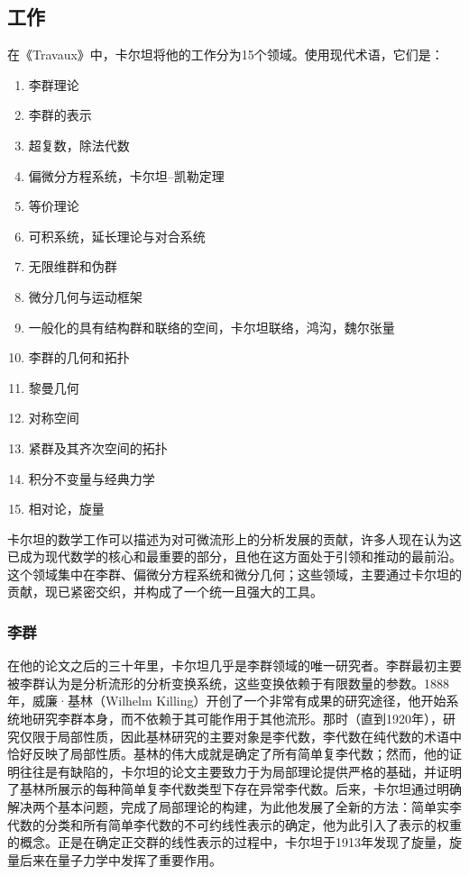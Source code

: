 \subsection{工作}  
在《Travaux》中，卡尔坦将他的工作分为15个领域。使用现代术语，它们是：
\begin{enumerate}
\item 李群理论  
\item 李群的表示  
\item 超复数，除法代数  
\item 偏微分方程系统，卡尔坦–凯勒定理  
\item 等价理论  
\item 可积系统，延长理论与对合系统  
\item 无限维群和伪群  
\item 微分几何与运动框架  
\item 一般化的具有结构群和联络的空间，卡尔坦联络，鸿沟，魏尔张量  
\item 李群的几何和拓扑  
\item 黎曼几何  
\item 对称空间  
\item 紧群及其齐次空间的拓扑  
\item 积分不变量与经典力学  
\item 相对论，旋量  
\end{enumerate}
卡尔坦的数学工作可以描述为对可微流形上的分析发展的贡献，许多人现在认为这已成为现代数学的核心和最重要的部分，且他在这方面处于引领和推动的最前沿。这个领域集中在李群、偏微分方程系统和微分几何；这些领域，主要通过卡尔坦的贡献，现已紧密交织，并构成了一个统一且强大的工具。
\subsubsection{李群}  
在他的论文之后的三十年里，卡尔坦几乎是李群领域的唯一研究者。李群最初主要被李群认为是分析流形的分析变换系统，这些变换依赖于有限数量的参数。1888年，威廉·基林（Wilhelm Killing）开创了一个非常有成果的研究途径，他开始系统地研究李群本身，而不依赖于其可能作用于其他流形。那时（直到1920年），研究仅限于局部性质，因此基林研究的主要对象是李代数，李代数在纯代数的术语中恰好反映了局部性质。基林的伟大成就是确定了所有简单复李代数；然而，他的证明往往是有缺陷的，卡尔坦的论文主要致力于为局部理论提供严格的基础，并证明了基林所展示的每种简单复李代数类型下存在异常李代数。后来，卡尔坦通过明确解决两个基本问题，完成了局部理论的构建，为此他发展了全新的方法：简单实李代数的分类和所有简单李代数的不可约线性表示的确定，他为此引入了表示的权重的概念。正是在确定正交群的线性表示的过程中，卡尔坦于1913年发现了旋量，旋量后来在量子力学中发挥了重要作用。

